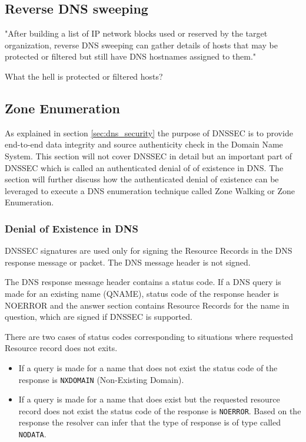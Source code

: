 \subsection{Reverse DNS sweeping}

"After building a list of IP network blocks used or reserved by        the target organization,  reverse DNS sweeping can gather details of hosts that may be protected or filtered but still have DNS hostnames assigned to them." \cite{network_sec_assessment}

What the hell is protected or filtered hosts?

\subsection{Zone Enumeration}

As explained in section \ref{sec:dns_security} the purpose of DNSSEC is to provide end-to-end data integrity and source authenticity check in the Domain Name System. This section will not cover DNSSEC in detail but an important part of DNSSEC which is called an authenticated denial of 
of existence in DNS. The section will further discuss how the authenticated denial of existence can be leveraged to execute a DNS enumeration technique called Zone Walking or Zone Enumeration.

\subsubsection{Denial of Existence in DNS}

DNSSEC signatures are used only for signing the Resource Records in the DNS response message or packet. The DNS message header is not signed.  

The DNS response message header contains a status code. If a DNS query is made for an existing name (QNAME), status code of the response header is NOERROR and the answer section contains Resource Records for the name in question, which are signed if DNSSEC is supported.

There are two cases of status codes corresponding to situations where requested Resource record does not exits.

\begin{itemize}
 \item If a query is made for a name that does not exist the status code of the response is \texttt{NXDOMAIN} (Non-Existing Domain).  
 \item If a query is made for a name that does exist but the requested resource record does not exist the status code of the response is \texttt{NOERROR}. Based on the response the resolver can infer that the type of response is of type called \texttt{NODATA}.
\end{itemize}


